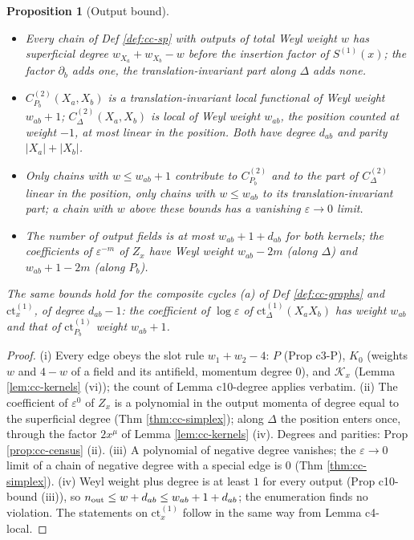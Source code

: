 \documentclass[11pt]{article}
\numberwithin{equation}{section}
\theoremstyle{plain}
\newtheorem{proposition}[theorem]{Proposition}
\theoremstyle{definition}
\begin{document}
\begin{proposition}[Output bound]
\label{prop:cc-bound}
\begin{itemize}
\item[(i)] Every chain of Def \ref{def:cc-sp} with outputs of total Weyl weight $w$ has superficial degree $w_{X_a}+w_{X_b}-w$ before the insertion factor of $S^{(1)}(x)$; the factor $\partial_b$ adds one, the translation-invariant part along $\Delta$ adds none.
\item[(ii)] $C^{(2)}_{P_b}(X_a,X_b)$ is a translation-invariant local functional of Weyl weight $w_{ab}+1$; $C^{(2)}_\Delta(X_a,X_b)$ is local of Weyl weight $w_{ab}$, the position counted at weight $-1$, at most linear in the position. Both have degree $d_{ab}$ and parity $|X_a|+|X_b|$.
\item[(iii)] Only chains with $w\le w_{ab}+1$ contribute to $C^{(2)}_{P_b}$ and to the part of $C^{(2)}_\Delta$ linear in the position, only chains with $w\le w_{ab}$ to its translation-invariant part; a chain with $w$ above these bounds has a vanishing $\varepsilon\to0$ limit.
\item[(iv)] The number of output fields is at most $w_{ab}+1+d_{ab}$ for both kernels; the coefficients of $\varepsilon^{-m}$ of $Z_x$ have Weyl weight $w_{ab}-2m$ (along $\Delta$) and $w_{ab}+1-2m$ (along $P_b$).
\end{itemize}
The same bounds hold for the composite cycles (a) of Def \ref{def:cc-graphs} and $\mathrm{ct}^{(1)}_x$, of degree $d_{ab}-1$: the coefficient of $\log\varepsilon$ of $\mathrm{ct}^{(1)}_\Delta(X_aX_b)$ has weight $w_{ab}$ and that of $\mathrm{ct}^{(1)}_{P_b}$ weight $w_{ab}+1$.
\end{proposition}

\begin{proof}
(i) Every edge obeys the slot rule $w_1+w_2-4$: $P$ (Prop c3-P), $K_0$ (weights $w$ and $4-w$ of a field and its antifield, momentum degree $0$), and $\mathcal K_x$ (Lemma \ref{lem:cc-kernels} (vi)); the count of Lemma c10-degree applies verbatim. (ii) The coefficient of $\varepsilon^0$ of $Z_x$ is a polynomial in the output momenta of degree equal to the superficial degree (Thm \ref{thm:cc-simplex}); along $\Delta$ the position enters once, through the factor $2x^\mu$ of Lemma \ref{lem:cc-kernels} (iv). Degrees and parities: Prop \ref{prop:cc-census} (ii). (iii) A polynomial of negative degree vanishes; the $\varepsilon\to0$ limit of a chain of negative degree with a special edge is $0$ (Thm \ref{thm:cc-simplex}). (iv) Weyl weight plus degree is at least $1$ for every output (Prop c10-bound (iii)), so $n_{\rm out}\le w+d_{ab}\le w_{ab}+1+d_{ab}$; the enumeration finds no violation. The statements on $\mathrm{ct}^{(1)}_x$ follow in the same way from Lemma c4-local.
\end{proof}
\end{document}
